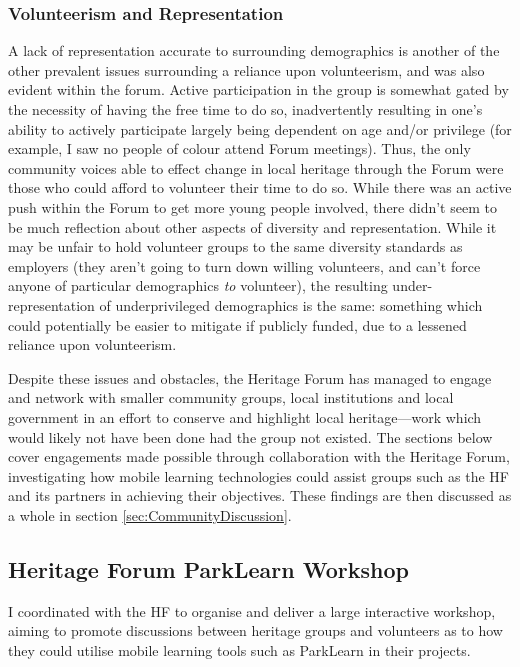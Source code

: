 \subsubsection{Volunteerism and Representation}
A lack of representation accurate to surrounding demographics is another of the other prevalent issues surrounding a reliance upon volunteerism, and was also evident within the forum. Active participation in the group is somewhat gated by the necessity of having the free time to do so, inadvertently resulting in one's ability to actively participate largely being dependent on age and/or privilege (for example, I saw no people of colour attend Forum meetings). Thus, the only community voices able to effect change in local heritage through the Forum were those who could afford to volunteer their time to do so. While there was an active push within the Forum to get more young people involved, there didn't seem to be much reflection about other aspects of diversity and representation. While it may be unfair to hold volunteer groups to the same diversity standards as employers (they aren't going to turn down willing volunteers, and can't force anyone of particular demographics \textit{to} volunteer), the resulting under-representation of underprivileged demographics is the same: something which could potentially be easier to mitigate if publicly funded, due to a lessened reliance upon volunteerism.

Despite these issues and obstacles, the Heritage Forum has managed to engage and network with smaller community groups, local institutions and local government in an effort to conserve and highlight local heritage---work which would likely not have been done had the group not existed. The sections below cover engagements made possible through collaboration with the Heritage Forum, investigating how mobile learning technologies could assist groups such as the HF and its partners in achieving their objectives. These findings are then discussed as a whole in section \ref{sec:CommunityDiscussion}.

\subsection{Heritage Forum ParkLearn Workshop}
\label{sec:HeritageParkLearnWorkshop}
I coordinated with the HF to organise and deliver a large interactive workshop, aiming to promote discussions between heritage groups and volunteers as to how they could utilise mobile learning tools such as ParkLearn in their projects. 

